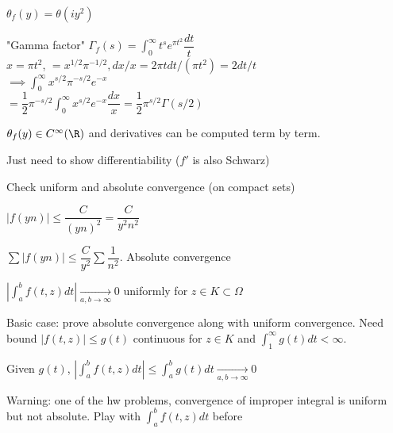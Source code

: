 \documentclass[10pt]{article}
\begin{document}
$\theta_f(y) = \theta(iy^2)$

"Gamma factor" $\Gamma_f(s) = \int_0^\infty t^se^{\pi t^2} \dfrac{dt}{t}$\\
$x = \pi t^2$, $ = x^{1/2}\pi^{-1/2}, dx/x = 2\pi t dt/(\pi t^2) = 2dt/t$\\
$\implies \int_0^\infty x^{s/2}\pi^{-s/2}e^{-x}$\\
$ = \dfrac{1}{2}\pi^{-s/2}\int_0^\infty x^{s/2}e^{-x} \dfrac{dx}{x} = \dfrac{1}{2}\pi^{s/2} \Gamma(s/2)$

\begin{lem}
   $\theta_f(y) \in C^\infty(\R)$ and derivatives can be computed term by term. 
\end{lem}
Just need to show differentiability ($f'$ is also Schwarz)

Check uniform and absolute convergence (on compact sets)

$|f(yn)| \leq \dfrac{C}{(yn)^2} = \dfrac{C}{y^2n^2}$

$\sum |f(yn)| \leq \dfrac{C}{y^2}\sum\dfrac{1}{n^2}$. Absolute convergence

$\left| \int_a^b f(t, z) dt\right| \underset{a, b \to \infty} {\to}0$ uniformly for $z \in K \subset \Omega$

Basic case: prove absolute convergence along with uniform convergence. Need bound $|f(t, z)| \leq g(t)$ continuous for $z\in K$ and $\int_1^{\infty} g(t) dt < \infty$.

Given $g(t)$, $\left|\int_a^b f(t, z) dt\right| \leq \int_a^b g(t) dt \underset{a, b \to \infty}{\to} 0$

Warning: one of the hw problems, convergence of improper integral is uniform but not absolute. Play with $\int_a^b f(t, z) dt$ before 
\end{document}
